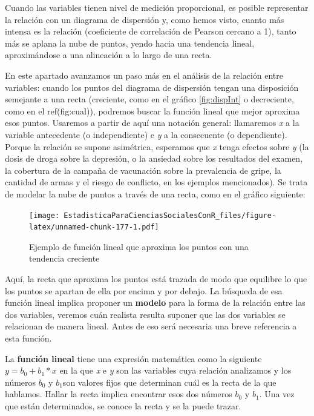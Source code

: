 \documentclass[]{book}
\begin{document}
Cuando las variables tienen nivel de medición proporcional, es posible
representar la relación con un diagrama de dispersión y, como hemos
visto, cuanto más intensa es la relación (coeficiente de correlación de Pearson cercano a 1), tanto más se aplana la nube de puntos, yendo hacia una tendencia lineal, aproximándose a una alineación a lo largo de una recta.

En este apartado avanzamos un paso más en el análisis de la relación
entre variables: cuando los puntos del diagrama de dispersión tengan una
disposición semejante a una recta (creciente, como en el gráfico \ref{fig:dispInt} o
decreciente, como en el ref(fig:cual)), podremos buscar la función lineal que mejor
aproxima esos puntos. Usaremos a partir de aquí una notación general:
llamaremos \emph{x} a la variable antecedente (o independiente) e \emph{y} a la
consecuente (o dependiente). Porque la relación se supone asimétrica,
esperamos que \emph{x} tenga efectos sobre \emph{y} (la dosis de droga sobre la
depresión, o la ansiedad sobre los resultados del examen, la cobertura de la campaña de vacunación sobre la prevalencia de gripe, la cantidad de armas y el riesgo de conflicto, en los ejemplos mencionados). Se trata de modelar la nube de puntos a través de
una recta, como en el gráfico siguiente:

\begin{figure}
\centering
\texttt{[image: EstadisticaParaCienciasSocialesConR\_files/figure-latex/unnamed-chunk-177-1.pdf]}
\caption{\label{fig:unnamed-chunk-177}Ejemplo de función lineal que aproxima los puntos con una tendencia creciente}
\end{figure}

Aquí, la recta que aproxima los puntos está trazada de modo que
equilibre lo que los puntos se apartan de ella por encima y por debajo.
La búsqueda de esa función lineal implica proponer un \textbf{modelo} para la
forma de la relación entre las dos variables, veremos cuán realista
resulta suponer que las dos variables se relacionan de manera lineal.
Antes de eso será necesaria una breve referencia a esta función.

La \textbf{función lineal} tiene una expresión matemática como la siguiente
\(y = b_{0} + b_{1}*x\) en la que \emph{x} e \emph{y} son las variables cuya
relación analizamos y los números \(b_{0}\) y \(b_{1}\)son valores fijos que
determinan cuál es la recta de la que hablamos. Hallar la recta implica
encontrar esos dos números \(b_{0}\) y \(b_{1}\). Una vez que están
determinados, se conoce la recta y se la puede trazar.
\end{document}

